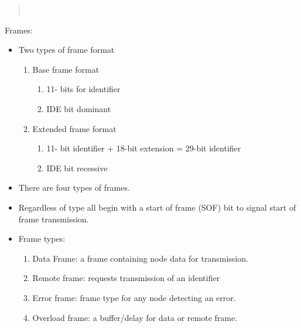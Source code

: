 \begin{quote}
~
\end{quote}

Frames:

\begin{itemize}
\item
  Two types of frame format

  \begin{enumerate}
  \def\labelenumi{\arabic{enumi}.}
  \item
    Base frame format

    \begin{enumerate}
    \def\labelenumii{\roman{enumii}.}
    \item
      11- bits for identifier
    \item
      IDE bit dominant
    \end{enumerate}
  \item
    Extended frame format

    \begin{enumerate}
    \def\labelenumii{\roman{enumii}.}
    \item
      11- bit identifier + 18-bit extension = 29-bit identifier
    \item
      IDE bit recessive
    \end{enumerate}
  \end{enumerate}
\item
  There are four types of frames.
\item
  Regardless of type all begin with a start of frame (SOF) bit to signal
  start of frame transmission.
\item
  Frame types:

  \begin{enumerate}
  \def\labelenumi{\arabic{enumi}.}
  \item
    Data Frame: a frame containing node data for transmission.
  \item
    Remote frame: requests transmission of an identifier
  \item
    Error frame: frame type for any node detecting an error.
  \item
    Overload frame: a buffer/delay for data or remote frame.
  \end{enumerate}
\end{itemize}


